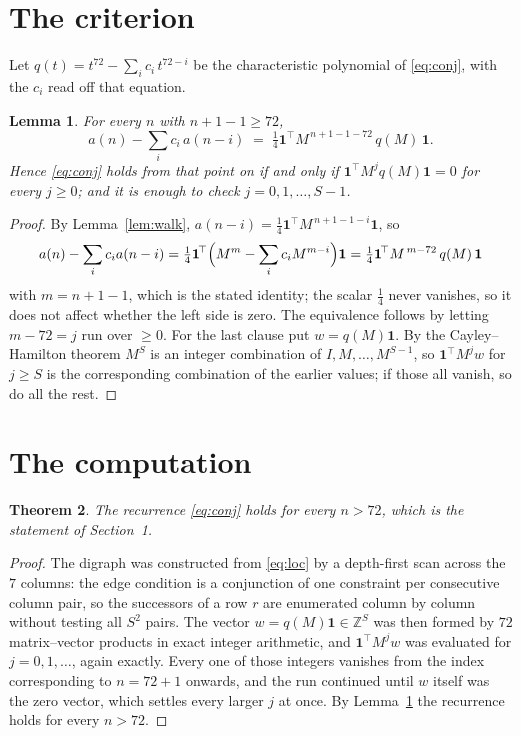 \documentclass[11pt,a4paper]{article}
\theoremstyle{plain}
\newtheorem{theorem}{Theorem}
\newtheorem{lemma}[theorem]{Lemma}
\theoremstyle{definition}
\begin{document}
\section{The criterion}

Let $q(t)=t^{72}-\sum_i c_i\,t^{72-i}$ be the characteristic polynomial of
\eqref{eq:conj}, with the $c_i$ read off that equation.

\begin{lemma}\label{lem:crit}
For every $n$ with $n+1-1\ge72$,
\[
a(n)-\sum_i c_i\,a(n-i)\;=\;\tfrac1{4}\mathbf{1}^{\!\top}M^{\,n+1-1-72}\,q(M)\,\mathbf{1} .
\]
Hence \eqref{eq:conj} holds from that point on if and only if
$\mathbf{1}^{\!\top}M^{j}q(M)\mathbf{1}=0$ for every $j\ge0$; and it is enough to check
$j=0,1,\dots,S-1$.
\end{lemma}

\begin{proof}
By Lemma~\ref{lem:walk}, $a(n-i)=\tfrac1{4}\mathbf{1}^{\!\top}M^{\,n+1-1-i}\mathbf{1}$, so
\[
a(n)-\sum_i c_i a(n-i)
=\tfrac1{4}\mathbf{1}^{\!\top}\Bigl(M^{m}-\sum_i c_i M^{m-i}\Bigr)\mathbf{1}
=\tfrac1{4}\mathbf{1}^{\!\top}M^{\,m-72}\,q(M)\,\mathbf{1}
\]
with $m=n+1-1$, which is the stated identity; the scalar $\tfrac1{4}$ never vanishes, so
it does not affect whether the left side is zero. The equivalence follows by letting
$m-72=j$ run over $\ge0$. For the last clause put $w=q(M)\mathbf{1}$. By the
Cayley--Hamilton theorem $M^{S}$ is an integer combination of $I,M,\dots,M^{S-1}$, so
$\mathbf{1}^{\!\top}M^{j}w$ for $j\ge S$ is the corresponding combination of the earlier
values; if those all vanish, so do all the rest.
\end{proof}

\section{The computation}

\begin{theorem}
The recurrence \eqref{eq:conj} holds for every $n>72$, which is the statement of
Section~1.
\end{theorem}

\begin{proof}
The digraph was constructed from \eqref{eq:loc} by a depth-first scan across the $7$
columns: the edge condition is a conjunction of one constraint per consecutive column
pair, so the successors of a row $r$ are enumerated column by column without testing all
$S^2$ pairs. The vector $w=q(M)\mathbf{1}\in\mathbb{Z}^{S}$ was then formed by $72$
matrix--vector products in exact integer arithmetic, and $\mathbf{1}^{\!\top}M^{j}w$ was
evaluated for $j=0,1,\dots$, again exactly. Every one of those integers vanishes from the
index corresponding to $n=72+1$ onwards, and the run continued until $w$ itself was the
zero vector, which settles every larger $j$ at once. By Lemma~\ref{lem:crit} the recurrence
holds for every $n>72$.
\end{proof}
\end{document}
